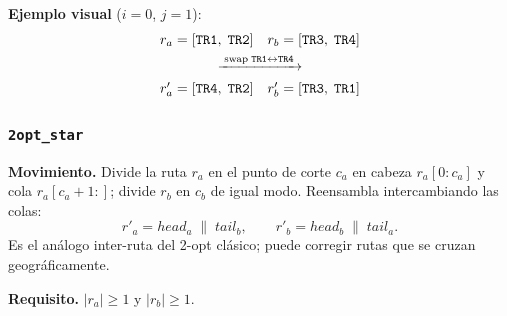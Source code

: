 \noindent\textbf{Ejemplo visual} ($i=0$, $j=1$):
\[
    \begin{array}{ll}
        r_a = [\mathtt{TR1},\;\mathtt{TR2}]
        & r_b = [\mathtt{TR3},\;\mathtt{TR4}] \\[4pt]
        \multicolumn{2}{c}{\xrightarrow{\;\text{swap}\;\mathtt{TR1}\leftrightarrow\mathtt{TR4}\;}} \\[4pt]
        r'_a = [\mathtt{TR4},\;\mathtt{TR2}]
        & r'_b = [\mathtt{TR3},\;\mathtt{TR1}]
    \end{array}
\]

\subsubsection{\texttt{2opt\_star}}
\label{sssec:2opt-star}

\textbf{Movimiento.}
Divide la ruta $r_a$ en el punto de corte $c_a$ en cabeza $r_a[0{:}c_a]$ y
cola $r_a[c_a{+}1{:}]$; divide $r_b$ en $c_b$ de igual modo.  Reensambla
intercambiando las colas:
\[
    r'_a = \mathit{head}_a \;\|\; \mathit{tail}_b,
    \qquad
    r'_b = \mathit{head}_b \;\|\; \mathit{tail}_a.
\]
Es el análogo inter-ruta del 2-opt clásico; puede corregir rutas que se
cruzan geográficamente.

\textbf{Requisito.} $|r_a| \geq 1$ y $|r_b| \geq 1$.


